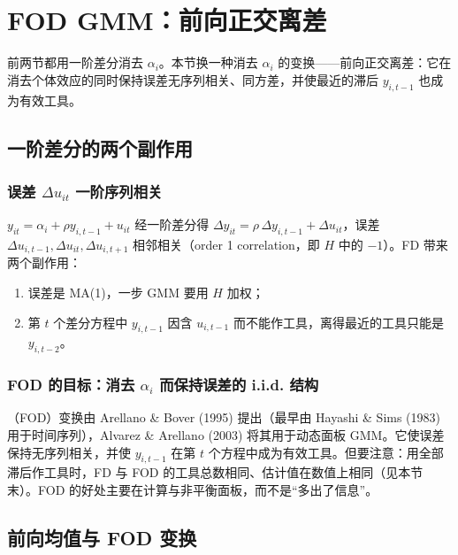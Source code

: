\section{FOD GMM：前向正交离差}\label{sec:U12b-fod}

前两节都用一阶差分消去 $\alpha_i$。本节换一种消去 $\alpha_i$ 的变换——前向正交离差：它在消去个体效应的同时保持误差无序列相关、同方差，并使最近的滞后 $y_{i,t-1}$ 也成为有效工具。

\subsection{一阶差分的两个副作用}

\subsubsection{误差 \texorpdfstring{$\Delta u_{it}$}{Delta u} 一阶序列相关}

$y_{it}=\alpha_i+\rho y_{i,t-1}+u_{it}$ 经一阶差分得 $\Delta y_{it}=\rho\,\Delta y_{i,t-1}+\Delta u_{it}$，误差 $\Delta u_{i,t-1},\Delta u_{it},\Delta u_{i,t+1}$ 相邻相关（order 1 correlation，即 $H$ 中的 $-1$）。FD 带来两个副作用：
\begin{enumerate}
  \item 误差是 MA(1)，一步 GMM 要用 $H$ 加权；
  \item 第 $t$ 个差分方程中 $y_{i,t-1}$ 因含 $u_{i,t-1}$ 而不能作工具，离得最近的工具只能是 $y_{i,t-2}$。
\end{enumerate}

\subsubsection{FOD 的目标：消去 \texorpdfstring{$\alpha_i$}{alpha\_i} 而保持误差的 i.i.d. 结构}

（FOD）变换由 Arellano \& Bover (1995) 提出（最早由 Hayashi \& Sims (1983) 用于时间序列），Alvarez \& Arellano (2003) 将其用于动态面板 GMM。它使误差保持无序列相关，并使 $y_{i,t-1}$ 在第 $t$ 个方程中成为有效工具。但要注意：用全部滞后作工具时，FD 与 FOD 的工具总数相同、估计值在数值上相同（见本节末）。FOD 的好处主要在计算与非平衡面板，而不是“多出了信息”。

\subsection{前向均值与 FOD 变换}

